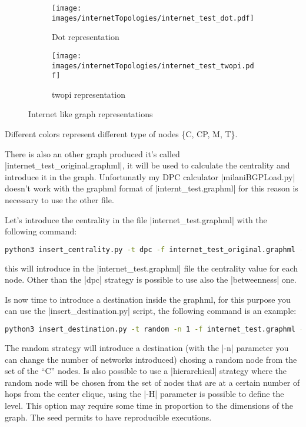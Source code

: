\documentclass[10pt,journal,onecolumn]{IEEEtran}
\newcommand{\q}[1]{``#1''}
\begin{document}
\begin{figure}[H]
     \centering
     \begin{subfigure}[b]{0.38\textwidth}
         \centering
         \texttt{[image: images/internetTopologies/internet\_test\_dot.pdf]}
         \caption{Dot representation}
         \label{fig:internet_like_dot}
     \end{subfigure}
     \hfill
     \begin{subfigure}[b]{0.38\textwidth}
         \centering
         \texttt{[image: images/internetTopologies/internet\_test\_twopi.pdf]}
         \caption{twopi representation}
         \label{fig:internet_like_twopi}
     \end{subfigure}
	 \caption{Internet like graph representations}
     \label{fig:internet_like}
\end{figure}
Different colors represent different type of nodes \{C, CP, M, T\}.

There is also an other graph produced it's called |internet_test_original.graphml|,
it will be used to calculate the centrality and introduce it in the graph.
Unfortunatly my \ac{DPC} calculator |milaniBGPLoad.py| doesn't work with the graphml format of
|internt_test.graphml| for this reason is necessary to use the other file.

Let's introduce the centrality in the file |internet_test.graphml| with the following
command:
\begin{lstlisting}[language=bash]
python3 insert_centrality.py -t dpc -f internet_test_original.graphml -o internet_test.graphml
\end{lstlisting}
this will introduce in the |internet_test.graphml| file the centrality value
for each node.
Other than the |dpc| strategy is possible to use also the |betweenness| one.

Is now time to introduce a destination inside the graphml, for this purpose you
can use the |insert_destination.py| script, the following command is an example:
\begin{lstlisting}[language=bash]
python3 insert_destination.py -t random -n 1 -f internet_test.graphml -o internet_test.graphml -s 0
\end{lstlisting}
The random strategy will introduce a destination (with the |-n| parameter you
can change the number of networks introduced) chosing a random node from the
set of the \q{C} nodes.
Is also possible to use a |hierarchical| strategy where the random node will
be chosen from the set of nodes that are at a certain number of hops from the center
clique, using the |-H| parameter is possible to define the level.
This option may require some time in proportion to the dimensions of the graph.
The seed permits to have reproducible executions.
\end{document}
